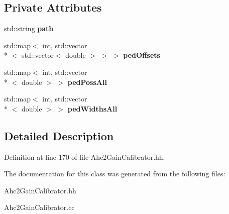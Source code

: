 \subsection*{Private Attributes}
\begin{DoxyCompactItemize}
\item 
std\-::string {\bfseries path}\label{classCALICE_1_1Ahc2GainCalibrator_1_1PedestalCalibrator_ad9e48a9fea8ab725064fd89010bea802}

\item 
std\-::map$<$ int, std\-::vector\\*
$<$ std\-::vector$<$ double $>$ $>$ $>$ {\bfseries ped\-Offsets}\label{classCALICE_1_1Ahc2GainCalibrator_1_1PedestalCalibrator_aaaae6b293fabca77df498630602cd855}

\item 
std\-::map$<$ int, std\-::vector\\*
$<$ double $>$ $>$ {\bfseries ped\-Poss\-All}\label{classCALICE_1_1Ahc2GainCalibrator_1_1PedestalCalibrator_af030b52d51d501b355bcffcefd621e4e}

\item 
std\-::map$<$ int, std\-::vector\\*
$<$ double $>$ $>$ {\bfseries ped\-Widths\-All}\label{classCALICE_1_1Ahc2GainCalibrator_1_1PedestalCalibrator_a4738b2623dc8561000d33a3e348415d7}

\end{DoxyCompactItemize}


\subsection{Detailed Description}


Definition at line 170 of file Ahc2\-Gain\-Calibrator.\-hh.



The documentation for this class was generated from the following files\-:\begin{DoxyCompactItemize}
\item 
Ahc2\-Gain\-Calibrator.\-hh\item 
Ahc2\-Gain\-Calibrator.\-cc\end{DoxyCompactItemize}
